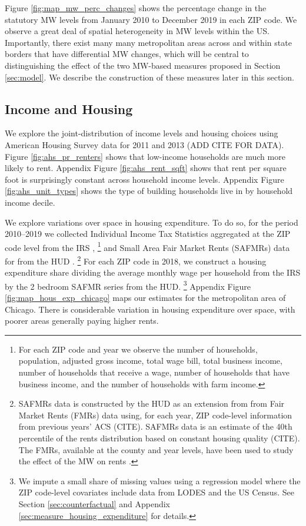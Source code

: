 Figure \ref{fig:map_mw_perc_changes} shows the percentage change 
in the statutory MW levels from January 2010 to December 2019 in each ZIP code.
We observe a great deal of spatial heterogeneity in MW levels within the US.
Importantly, there exist many many metropolitan areas across and within state 
borders that have differential MW changes, which will be central to 
distinguishing the effect of the two MW-based measures proposed in 
Section \ref{sec:model}.
We describe the construction of these measures later in this section.


\subsection{Income and Housing}

We explore the joint-distribution of income levels and housing choices using 
American Housing Survey data for 2011 and 2013 (ADD CITE FOR DATA).
Figure \ref{fig:ahs_pr_renters} shows that low-income households are much
more likely to rent.
Appendix Figure \ref{fig:ahs_rent_sqft} shows that rent per square foot is 
surprisingly constant across household income levels.
Appendix Figure \ref{fig:ahs_unit_types} shows the type of building households
live in by household income decile.

We explore variations over space in housing expenditure.
To do so, for the period 2010--2019
we collected Individual Income Tax Statistics aggregated at the ZIP code level 
from the IRS \parencite{IRS},%
\footnote{For each ZIP code and year we observe the number of households, 
population, adjusted gross income, total wage bill, total business income, 
number of households that receive a wage, number of households that have 
business income, and the number of households with farm income.}
and Small Area Fair Market Rents (SAFMRs) data for from the HUD 
\parencite{hudSAFMR}.%
\footnote{SAFMRs data is constructed by the HUD as an extension from from 
Fair Market Rents (FMRs) data using, for each year, ZIP code-level information
from previous years' ACS (CITE).
SAFMRs data is an estimate of the 40th percentile of the rents distribution
based on constant housing quality (CITE).
The FMRs, available at the county and year levels, have been used to study the 
effect of the MW on rents \parencite{Tidemann2018, Yamagishi2019}.}
For each ZIP code in 2018, we construct a housing expenditure share dividing 
the average monthly wage per household from the IRS by the 2 bedroom SAFMR 
series from the HUD.%
\footnote{We impute a small share of missing values using a regression model 
where the ZIP code-level covariates include data from LODES and the US Census.
See Section \ref{sec:counterfactual} and Appendix 
\ref{sec:measure_housing_expenditure} for details.}
Appendix Figure \ref{fig:map_hous_exp_chicago} maps our estimates for the 
metropolitan area of Chicago.
There is considerable variation in housing expenditure over space, with poorer
areas generally paying higher rents.

